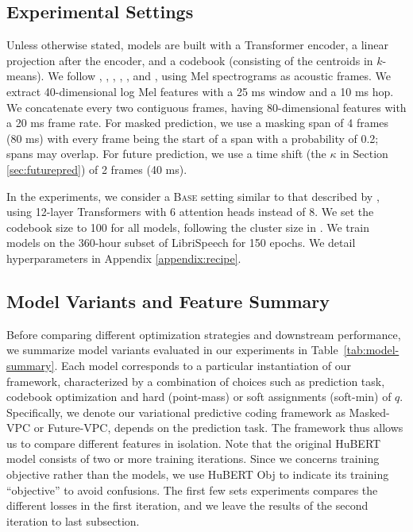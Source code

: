\subsection{Experimental Settings}
\label{exp:setup}

Unless otherwise stated, models are built with a Transformer encoder, a linear projection after the encoder, and a codebook (consisting of the centroids in $k$-means).
We follow \citet{chung2019unsupervised}, \citet{jiang2019improving}, \citet{ling2020decoar}, \citet{misra21_interspeech}, \citet{chiu2022self}, and \citet{lin2022melhubert}, using Mel spectrograms as acoustic frames.
We extract 40-dimensional log Mel features with a 25 ms window and a 10 ms hop.
We concatenate every two contiguous frames, having 80-dimensional features with a 20 ms frame rate.
For masked prediction, we use a masking span of 4 frames (80 ms) with every frame being the start of a span with a probability of 0.2; spans may overlap.
For future prediction, we use a time shift (the $\kappa$ in Section \ref{sec:futurepred}) of 2 frames (40 ms).

%
%
%
In the experiments, we consider a \textsc{Base} setting similar to that
described by \citet{baevski2020wav2vec,hsu2021hubert}, using 12-layer Transformers
with 6 attention heads instead of 8.
%
We set the codebook size to 100 for all models, following the cluster size
in \citet{hsu2021hubert}.
We train models on the 360-hour subset of LibriSpeech \citep{panayotov2015librispeech}
for 150 epochs.
We detail hyperparameters in Appendix \ref{appendix:recipe}.

%
%
%
%
%
%
%

\subsection{Model Variants and Feature Summary}

Before comparing different optimization strategies and downstream performance, we summarize 
model variants evaluated in our experiments in Table~\ref{tab:model-summary}.
Each model corresponds to a particular instantiation of our framework, characterized by a combination of choices such as prediction task, codebook optimization and hard (point-mass) or soft assignments (soft-min) of $q$.
Specifically, we denote our variational predictive coding framework as Masked-VPC or Future-VPC, depends on 
the prediction task.
The framework thus allows us to compare different features in isolation.
Note that the original HuBERT model \citep{hsu2021hubert} consists of two or more training iterations.
Since we concerns training objective rather than the models, 
we use HuBERT Obj to indicate its training ``objective'' to avoid confusions.
The first few sets experiments compares the different losses
in the first iteration, and we leave the results of the second
iteration to last subsection.

